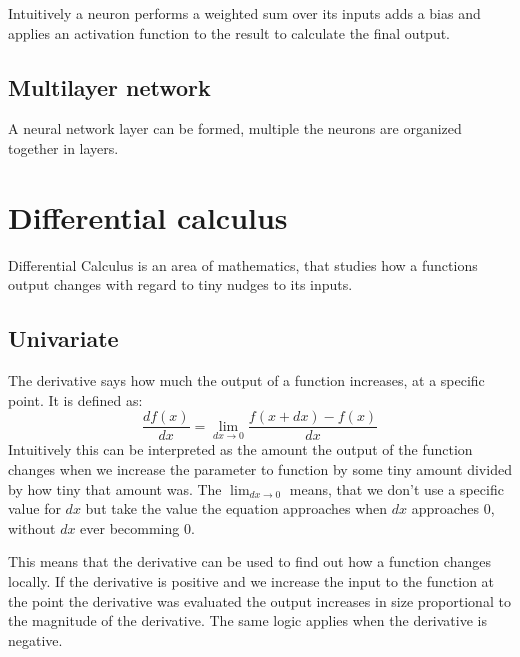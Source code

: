 \documentclass[a4paper, twoside, 10pt]{report}
\begin{document}
Intuitively a neuron performs a weighted sum over its inputs adds a bias and applies an activation function to the result to calculate the final output.

\subsection{Multilayer network}
A neural network layer can be formed, multiple  the neurons are organized together in layers.

\section{Differential calculus}
Differential Calculus is an area of mathematics, that studies how a functions output changes with regard to tiny nudges to its inputs. 

\subsection{Univariate}
The derivative says how much the output of a function increases, at a specific point. It is defined as: 
\begin{equation}
\frac{df(x)}{dx} = \lim_{dx \to 0}\frac{f(x + dx) - f(x)}{dx}
\end{equation}
Intuitively this can be interpreted as the amount the output of the function changes when we increase the parameter to function by some tiny amount divided by how tiny that amount was. The $\lim_{dx \to 0}$ means, that we don't use a specific value for $dx$ but take the value the equation approaches when $dx$ approaches $0$, without $dx$ ever becomming $0$.

This means that the derivative can be used to find out how a function changes locally. If the derivative is positive and we increase the input to the function at the point the derivative was evaluated the output increases in size proportional to the magnitude of the derivative. The same logic applies when the derivative is negative.

\end{document}
